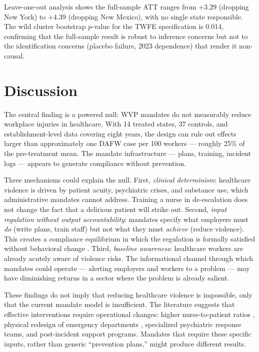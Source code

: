 \documentclass[12pt]{article}
\begin{document}
Leave-one-out analysis shows the full-sample ATT ranges from $+3.29$ (dropping New York) to $+4.39$ (dropping New Mexico), with no single state responsible. The wild cluster bootstrap $p$-value for the TWFE specification is 0.014, confirming that the full-sample result is robust to inference concerns but not to the identification concerns (placebo failure, 2023 dependence) that render it non-causal.

\section{Discussion}

The central finding is a powered null: WVP mandates do not measurably reduce workplace injuries in healthcare. With 14 treated states, 37 controls, and establishment-level data covering eight years, the design can rule out effects larger than approximately one DAFW case per 100 workers --- roughly 25\% of the pre-treatment mean. The mandate infrastructure --- plans, training, incident logs --- appears to generate compliance without prevention.

Three mechanisms could explain the null. First, \textit{clinical determinism}: healthcare violence is driven by patient acuity, psychiatric crises, and substance use, which administrative mandates cannot address. Training a nurse in de-escalation does not change the fact that a delirious patient will strike out. Second, \textit{input regulation without output accountability}: mandates specify what employers must \textit{do} (write plans, train staff) but not what they must \textit{achieve} (reduce violence). This creates a compliance equilibrium in which the regulation is formally satisfied without behavioral change \citep{coglianese2012}. Third, \textit{baseline awareness}: healthcare workers are already acutely aware of violence risks. The informational channel through which mandates could operate --- alerting employers and workers to a problem --- may have diminishing returns in a sector where the problem is already salient.

These findings do not imply that reducing healthcare violence is impossible, only that the current mandate model is insufficient. The literature suggests that effective interventions require operational changes: higher nurse-to-patient ratios \citep{aiken2002}, physical redesign of emergency departments \citep{kowalenko2012}, specialized psychiatric response teams, and post-incident support programs. Mandates that require these specific inputs, rather than generic ``prevention plans,'' might produce different results.
\end{document}
